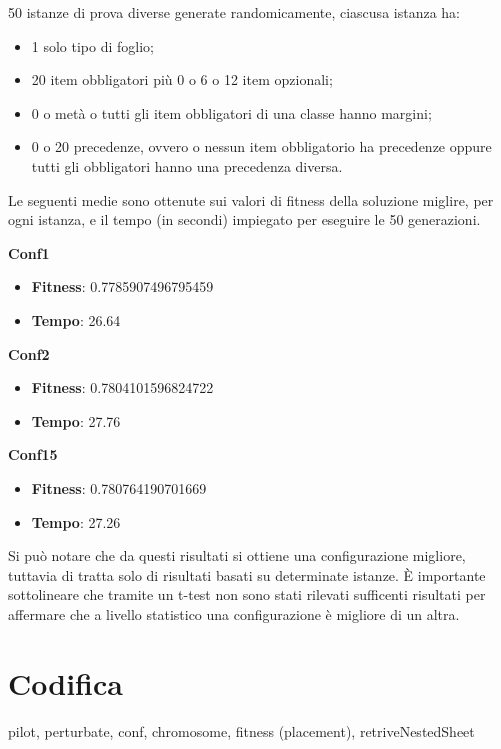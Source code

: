 50 istanze di prova diverse generate randomicamente, ciascusa istanza ha:
\begin{itemize}
	\item 1 solo tipo di foglio;
	\item 20 item obbligatori più 0 o 6 o 12 item opzionali;
	\item 0 o metà o tutti gli item obbligatori di una classe hanno margini;
	\item 0 o 20 precedenze, ovvero o nessun item obbligatorio ha precedenze oppure tutti gli obbligatori hanno una precedenza diversa.
\end{itemize}

Le seguenti medie sono ottenute sui valori di fitness della soluzione miglire, per ogni istanza, e il tempo (in secondi) impiegato per eseguire le 50 generazioni.

\noindent\textbf{Conf1}
\begin{itemize}
	\item\textbf{Fitness}: 0.7785907496795459
	\item\textbf{Tempo}: 26.64 
\end{itemize}
\textbf{Conf2}
\begin{itemize}
	\item\textbf{Fitness}: 0.7804101596824722
	\item\textbf{Tempo}: 27.76
\end{itemize}
\textbf{Conf15}
\begin{itemize}
	\item\textbf{Fitness}: 0.780764190701669
	\item\textbf{Tempo}: 27.26
\end{itemize}
Si può notare che da questi risultati si ottiene una configurazione migliore, tuttavia di tratta solo di risultati basati su determinate istanze. È importante sottolineare che tramite un t-test non sono stati rilevati sufficenti risultati per affermare che a livello statistico una configurazione è migliore di un altra. 

\section{Codifica}




pilot, perturbate, conf, chromosome, fitness (placement), retriveNestedSheet













